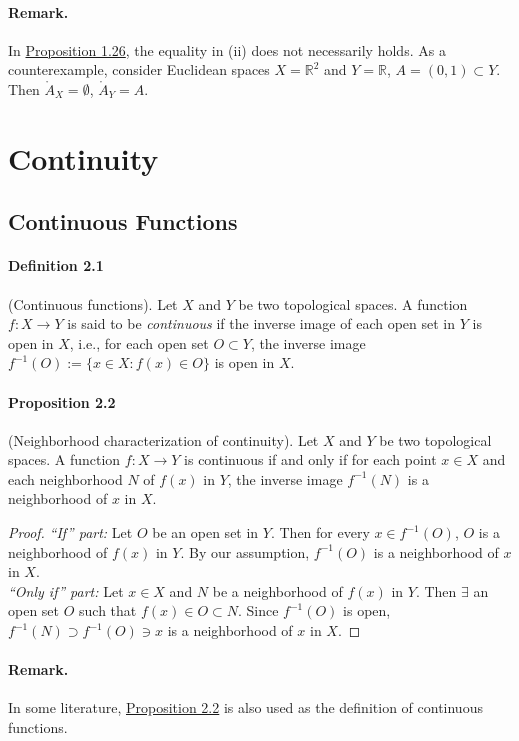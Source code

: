 \documentclass{article}
\numberwithin{equation}{section}
\theoremstyle{plain}
\theoremstyle{definition}
\begin{document}
\paragraph{Remark.} In \hyperref[prop:1.26]{Proposition 1.26}, the equality in (ii) does not necessarily holds. As a counterexample, consider Euclidean spaces $X=\mathbb{R}^2$ and $Y=\mathbb{R}$, $A = (0,1)\subset Y$. Then $\mathring{A}_X = \emptyset$, $\mathring{A}_Y=A$.

\newpage
\section{Continuity}
\subsection{Continuous Functions}
\paragraph{Definition 2.1\label{def:2.1}} (Continuous functions). Let $X$ and $Y$ be two topological spaces. A function $f:X\to Y$ is said to be \textit{continuous} if the inverse image of each open set in $Y$ is open in $X$, i.e., for each open set $O\subset Y$, the inverse image $f^{-1}(O):=\{x\in X:f(x)\in O\}$ is open in $X$.

\paragraph{Proposition 2.2\label{prop:2.2}} (Neighborhood characterization of continuity). Let $X$ and $Y$ be two topological spaces. A function $f:X\to Y$ is continuous if and only if for each point $x\in X$ and each neighborhood $N$ of $f(x)$ in $Y$, the inverse image $f^{-1}(N)$ is a neighborhood of $x$ in $X$.
\begin{proof}
\textit{``If'' part:} Let $O$ be an open set in $Y$. Then for every $x\in f^{-1}(O)$, $O$ is a neighborhood of $f(x)$ in $Y$. By our assumption, $f^{-1}(O)$ is a neighborhood of $x$ in $X$.\\
\textit{``Only if'' part:} Let $x\in X$ and $N$ be a neighborhood of $f(x)$ in $Y$. Then $\exists$ an open set $O$ such that $f(x)\in O\subset N$. Since $f^{-1}(O)$ is open, $f^{-1}(N)\supset f^{-1}(O)\ni x$ is a neighborhood of $x$ in $X$.
\end{proof}

\paragraph{Remark.} In some literature, \hyperref[prop:2.2]{Proposition 2.2} is also used as the definition of continuous functions.
\end{document}
